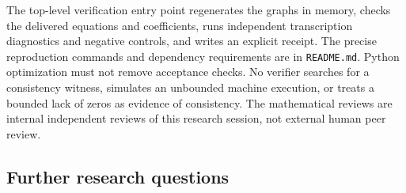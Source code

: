 \documentclass[11pt,a4paper]{article}
\theoremstyle{definition}\newtheorem{definition}[theorem]{Definition}
\theoremstyle{remark}\newtheorem{remark}[theorem]{Remark}
\numberwithin{equation}{section}
\begin{document}
The top-level verification entry point regenerates the graphs in memory,
checks the delivered equations and coefficients, runs independent
transcription diagnostics and negative controls, and writes an explicit
receipt. The precise reproduction commands and dependency requirements
are in \texttt{README.md}. Python optimization must not remove acceptance
checks. No verifier searches for a consistency witness, simulates an
unbounded machine execution, or treats a bounded lack of zeros as evidence
of consistency. The mathematical reviews are internal independent reviews
of this research session, not external human peer review.

\subsection{Further research questions}
\end{document}
